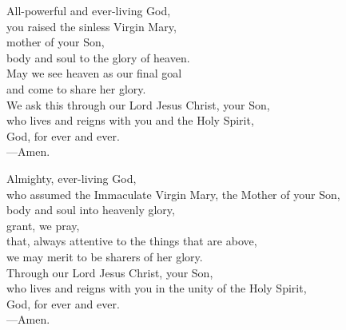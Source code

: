 \prayer


\begin{prayerverse}

All-powerful and ever-living God,\\
you raised the sinless Virgin Mary,\\
mother of your Son,\\
body and soul to the glory of heaven.\\
May we see heaven as our final goal\\
and come to share her glory.\\
We ask this through our Lord Jesus Christ, your Son,\\
who lives and reigns with you and the Holy Spirit,\\
God, for ever and ever.\\
{\color{red}---\thinspace}Amen.

\end{prayerverse}


\begin{prayerverse}

Almighty, ever-living God,\\
who assumed the Immaculate Virgin Mary, the Mother of your Son,\\
body and soul into heavenly glory,\\
grant, we pray,\\
that, always attentive to the things that are above,\\
we may merit to be sharers of her glory.\\
Through our Lord Jesus Christ, your Son,\\
who lives and reigns with you in the unity of the Holy Spirit,\\
God, for ever and ever.\\
{\color{red}---\thinspace}Amen.

\end{prayerverse}

